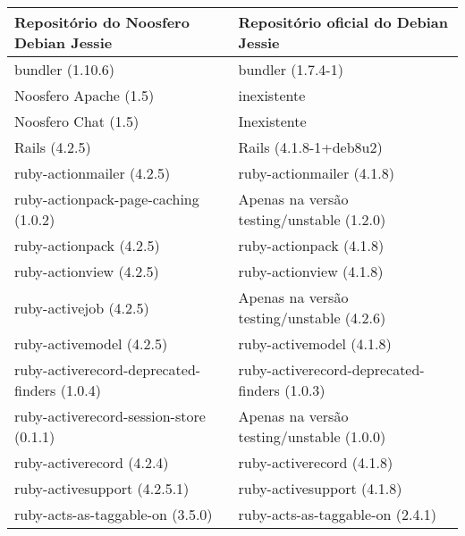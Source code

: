 \begin{table}[h]
    \begin{tabular}{l|l}
        \hline
        Repositório do Noosfero Debian Jessie & Repositório oficial do Debian Jessie                   \\ \hline
        bundler (1.10.6)                                 & bundler (1.7.4-1)                                                 \\ 
        Noosfero Apache (1.5)                            & inexistente                                                       \\ 
        Noosfero Chat (1.5)                              & Inexistente                                                       \\ 
        Rails (4.2.5)                                    & Rails (4.1.8-1+deb8u2)                                            \\ 
        ruby-actionmailer (4.2.5)                        & ruby-actionmailer (4.1.8)                                         \\ 
        ruby-actionpack-page-caching (1.0.2)             & Apenas na versão testing/unstable (1.2.0)  \\ 
        ruby-actionpack (4.2.5)                          & ruby-actionpack (4.1.8)                                           \\ 
        ruby-actionview (4.2.5)                          & ruby-actionview (4.1.8)                                           \\ 
         ruby-activejob (4.2.5)                          & Apenas na versão testing/unstable (4.2.6)  \\ 
        ruby-activemodel (4.2.5)                         & ruby-activemodel (4.1.8)                                          \\ 
        ruby-activerecord-deprecated-finders (1.0.4)     & ruby-activerecord-deprecated-finders (1.0.3)                      \\ 
        ruby-activerecord-session-store (0.1.1)          & Apenas na versão testing/unstable (1.0.0)  \\ 
        ruby-activerecord (4.2.4)                        & ruby-activerecord (4.1.8)                                         \\ 
        ruby-activesupport (4.2.5.1)                     & ruby-activesupport (4.1.8)                                        \\ 
        ruby-acts-as-taggable-on (3.5.0)                 & ruby-acts-as-taggable-on (2.4.1)                                  \\ 

\end{tabular}
\end{table}
